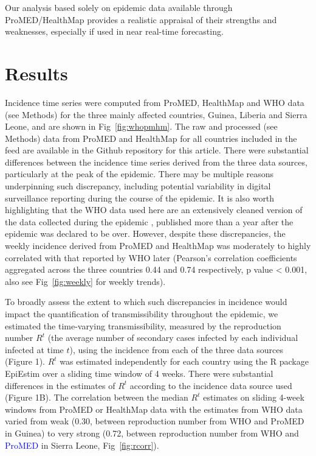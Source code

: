\documentclass[9pt,twocolumn,twoside,lineno]{pnas-new}
\newcommand{\sangeeta}[1]{\textcolor{blue}{#1}}
\begin{document}
Our analysis based solely on epidemic data available through
ProMED/HealthMap provides a realistic appraisal of their strengths and
weaknesses, especially if used in near real-time forecasting.

\section*{Results}

Incidence time series were computed from ProMED, HealthMap and WHO data
(see Methods) for the three mainly affected countries, Guinea,
Liberia and Sierra Leone, and are shown in Fig~\ref{fig:whopmhm}. The raw and
processed (see Methods) data from ProMED and HealthMap for all countries
included in the feed are available in the Github repository for this
article. There were
substantial differences between the incidence time series derived from
the three data sources, particularly at the peak of the epidemic. There
may be multiple reasons underpinning such discrepancy, including
potential variability in digital surveillance reporting during the
course of the epidemic. It is also worth highlighting that the WHO data
used here are an extensively cleaned version of the data collected
during the epidemic \cite{who2014ebola, team2015west}, published
more than a year after the epidemic was declared to be over. However,
despite these discrepancies, the weekly incidence derived from ProMED
and HealthMap was moderately to highly correlated with that reported by
WHO later (Pearson's correlation coefficients aggregated across the
three countries 0.44 and 0.74 respectively, p value \textless{} 0.001,
also see Fig~\ref{fig:weekly} for weekly trends).

To broadly assess the extent to which such discrepancies in incidence
would impact the quantification of transmissibility throughout the
epidemic, we estimated the time-varying transmissibility, measured by
the reproduction number \(R^t\) (the average number of secondary cases
infected by each individual infected at time \(t\)), using the incidence
from each of the three data sources (Figure 1). \(R^t\) was estimated
independently for each country using the R package EpiEstim
\cite{cori2013new} over a sliding time window of 4 weeks. There were
substantial differences in the estimates of \(R^t\) according to the
incidence data source used (Figure 1B). The correlation between the
median $R^t$ estimates on sliding 4-week windows from ProMED or HealthMap
data with the estimates from WHO data varied from weak (0.30, between
reproduction number from WHO and ProMED in Guinea) to very strong
(0.72, between reproduction number from WHO and \sangeeta{ProMED} in Sierra
Leone, Fig~\ref{fig:rcorr}).
\end{document}
